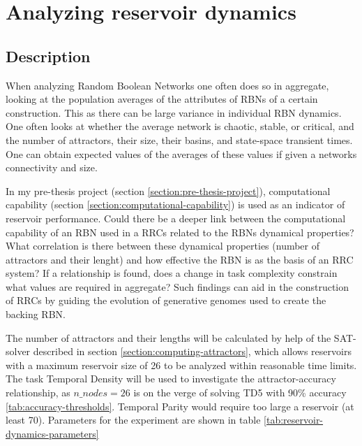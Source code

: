 \section{Analyzing reservoir dynamics}
\label{section:reservoir-dynamics}

\subsection{Description}

When analyzing Random Boolean Networks one often does so in aggregate,
looking at the population averages of the attributes of RBNs of a certain construction.
This as there can be large variance in individual RBN dynamics.
One often looks at whether the average network is chaotic, stable, or critical,
and the number of attractors, their size, their basins, and state-space transient times.
One can obtain expected values of the averages of these values if given a networks connectivity and size.

In my pre-thesis project (section \ref{section:pre-thesis-project}),
computational capability (section \ref{section:computational-capability}) is used as an indicator of reservoir performance.
Could there be a deeper link between the computational capability of an RBN used in a RRCs related to the RBNs dynamical properties?
What correlation is there between these dynamical properties (number of attractors and their lenght)
and how effective the RBN is as the basis of an RRC system?
If a relationship is found, does a change in task complexity constrain what values are required in aggregate?
Such findings can aid in the construction of RRCs by guiding the evolution of generative genomes used to create the backing RBN.

The number of attractors and their lengths will be calculated by help of the SAT-solver described in section \ref{section:computing-attractors},
which allows reservoirs with a maximum reservoir size of 26 to be analyzed within reasonable time limits.
The task Temporal Density will be used to investigate the attractor-accuracy relationship,
as $ n\_nodes = 26 $ is on the verge of solving TD5 with 90\% accuracy \ref{tab:accuracy-thresholds}.
Temporal Parity would require too large a reservoir (at least 70).
Parameters for the experiment are shown in table \ref{tab:reservoir-dynamics-parameters}


